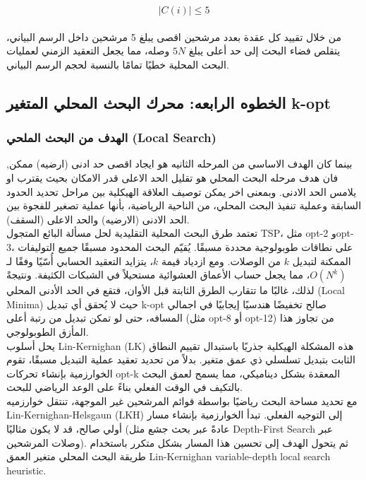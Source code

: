 \documentclass{article}
\newcommand{\en}[1]{\textenglish{#1}}
\begin{document}
{\LARGE$$
	|C(i)| \le 5
$$}\\

من خلال تقييد كل عقدة بعدد مرشحين اقصى يبلغ 5 مرشحين داخل الرسم البياني، يتقلص فضاء البحث إلى حد أعلى يبلغ $5N$ وصله، مما يجعل التعقيد الزمني لعمليات البحث المحلية خطيًا تمامًا بالنسبة لحجم الرسم البياني.
\subsection{الخطوه الرابعه: محرك البحث المحلي المتغير \en{k-opt}}
\subsubsection{الهدف من البحث الملحي (\en{Local Search})}
بينما كان الهدف الاساسي من المرحله الثانيه هو ايجاد اقصى حد ادنى (ارضيه) ممكن, فان هدف مرحله البحث المحلي هو تقليل الحد الاعلى قدر الامكان بحيث يقترب او يلامس الحد الادنى. وبمعنى اخر يمكن توصيف العلاقة الهيكلية بين مراحل تحديد الحدود السابقة وعملية تنفيذ البحث المحلي، من الناحية الرياضية، بأنها عملية تصغير للفجوة بين الحد الادنى (الارضيه) والحد الاعلى (السقف).\\

تعتمد طرق البحث المحلية التقليدية لحل مسألة البائع المتجول \en{TSP}، مثل \en{opt-2} و\en{opt-3}، على نطاقات طوبولوجية محددة مسبقًا. يُقيّم البحث المحدود مسبقًا جميع التوليفات الممكنة لتبديل $k$ من الوصلات. ومع ازدياد قيمة $k$، يتزايد التعقيد الحسابي أُسّيًا وفقًا لـ $O(N^k)$، مما يجعل حساب الأعماق العشوائية مستحيلاً في الشبكات الكثيفة. ونتيجةً لذلك، غالبًا ما تتقارب الطرق الثابتة قبل الأوان، فتقع في الحد الأدنى المحلي (\en{Local Minima}) حيث لا يُحقق أي تبديل \en{k-opt} صالح تخفيضًا هندسيًا إيجابيًا في اجمالي المسافه، حتى لو تمكن تبديل من رتبة أعلى (مثل \en{opt-8} أو \en{opt-12}) من تجاوز هذا المأزق الطوبولوجي.\\

يحل أسلوب \en{Lin-Kernighan (LK)} هذه المشكلة الهيكلية جذريًا باستبدال تقييم النطاق الثابت بتبديل تسلسلي ذي عمق متغير. بدلاً من تحديد تعقيد عملية التبديل مسبقًا، تقوم الخوارزمية بإنشاء تحركات \en{opt-k} المعقدة بشكل ديناميكي، مما يسمح لعمق البحث بالتكيف في الوقت الفعلي بناءً على الوعد الرياضي للبحث.\\

مع تحديد مساحة البحث رياضيًا بواسطة قوائم المرشحين غير الموجهة، تنتقل خوارزميه \en{Lin-Kernighan-Helsgaun (LKH)} إلى التوجيه الفعلي. تبدأ الخوارزمية بإنشاء مسار أولي صالح، قد لا يكون مثاليًا (عادةً عبر بحث جشع مثل \en{Depth-First Search} عبر وصلات المرشحين). ثم يتحول الهدف إلى تحسين هذا المسار بشكل متكرر باستخدام طريقة البحث المحلي متغير العمق \en{Lin-Kernighan variable-depth local search heuristic}.
\end{document}
